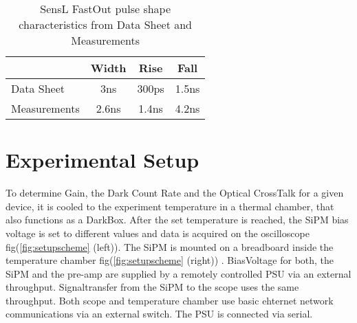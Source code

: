\documentclass[article,type=pp,colorback,accentcolor=tud9c]{tudthesis}
\begin{document}
\begin{center}
\begin{table}[h]
\begin{center}
\begin{tabular}{| p{3cm} | c | c | c |}
  \hline
  & Width & Rise & Fall \\   \hline
  Data Sheet & 3ns & 300ps & 1.5ns \\  \hline
  Measurements & 2.6ns & 1.4ns & 4.2ns\\
  \hline
 \end{tabular}
\end{center}
\caption{SensL FastOut pulse shape characteristics from Data Sheet and Measurements}
\end{table}
\end{center}

\newpage
  \section{Experimental Setup}

      To determine Gain, the Dark Count Rate and the Optical CrossTalk for a given device, it is cooled to the experiment temperature in a thermal chamber, that also functions as a DarkBox. After the set temperature is reached, the SiPM bias voltage is set to different values and data is acquired on the oscilloscope fig(\ref{fig:setupscheme} (left)). The SiPM is mounted on a breadboard inside the temperature chamber fig(\ref{fig:setupscheme} (right)) . BiasVoltage for both, the SiPM and the pre-amp are supplied by a remotely controlled PSU via an external throughput. Signaltransfer from the SiPM to the scope uses the same throughput. Both scope and temperature chamber use basic ehternet network communications via an external switch. The PSU is connected via serial.
    
    
\begin{figure}[h]
\begin{centering}
  }
    \resizebox{0.4\columnwidth}{!}{\texttt{[image: ./Fig/\{Setup3]}.png}}
\caption{Experimental Setup Scheme}
\label{fig:setupscheme}
\end{centering}
\end{figure}
    
    
\end{document}
